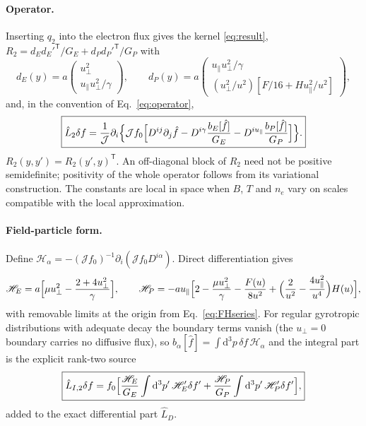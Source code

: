 \documentclass[11pt,a4paper]{article}
\numberwithin{equation}{section}
\newcommand{\dd}{\mathrm{d}}
\newcommand{\upar}{u_\parallel}
\newcommand{\uperp}{u_\perp}
\newcommand{\fh}{\hat f}
\newcommand{\sH}{\mathscr H}
\begin{document}
\paragraph{Operator.} Inserting $q_2$ into the electron flux gives the kernel
\eqref{eq:result}, $R_2=d_Ed_E'^{\mathsf T}/G_E+d_Pd_P'^{\mathsf T}/G_P$ with
\begin{equation}
d_E(y)=a\begin{pmatrix}\uperp^2\\ \upar\uperp^2/\gamma\end{pmatrix},\qquad
d_P(y)=a\begin{pmatrix}\upar\uperp^2/\gamma\\ (\uperp^2/u^2)[F/16+H\upar^2/u^2]\end{pmatrix},
\end{equation}
and, in the convention of Eq.~\eqref{eq:operator},
\begin{equation}
\boxed{\hat L_2\delta f=\frac1{\mathcal J}\partial_i\Bigl\{\mathcal Jf_0\Bigl[D^{ij}\partial_j\fh-D^{i\gamma}\frac{b_E[\fh]}{G_E}-D^{i\upar}\frac{b_P[\fh]}{G_P}\Bigr]\Bigr\}.}
\end{equation}
$R_2(y,y')=R_2(y',y)^{\mathsf T}$. An off-diagonal block of $R_2$ need not be
positive semidefinite; positivity of the whole operator follows from its
variational construction. The constants are local in space when $B$, $T$ and
$n_e$ vary on scales compatible with the local approximation.

\paragraph{Field-particle form.} Define
$\sH_\alpha=-(\mathcal Jf_0)^{-1}\partial_i(\mathcal Jf_0D^{i\alpha})$. Direct
differentiation gives
\begin{equation}
\sH_E=a\Bigl[\mu\uperp^2-\frac{2+4\uperp^2}{\gamma}\Bigr],\qquad
\sH_P=-a\upar\Bigl[2-\frac{\mu\uperp^2}{\gamma}-\frac{F(u)}{8u^2}+\Bigl(\frac2{u^2}-\frac{4\upar^2}{u^4}\Bigr)H(u)\Bigr],
\end{equation}
with removable limits at the origin from Eq.~\eqref{eq:FHseries}. For regular
gyrotropic distributions with adequate decay the boundary terms vanish (the
$\uperp=0$ boundary carries no diffusive flux), so $b_\alpha[\fh]=\int\dd^3p\,\delta f\,\sH_\alpha$
and the integral part is the explicit rank-two source
\begin{equation}
\boxed{\hat L_{I,2}\delta f=f_0\Bigl[\frac{\sH_E}{G_E}\int\dd^3p'\,\sH_E'\delta f'+\frac{\sH_P}{G_P}\int\dd^3p'\,\sH_P'\delta f'\Bigr],}
\end{equation}
added to the exact differential part $\hat L_D$.
\end{document}
